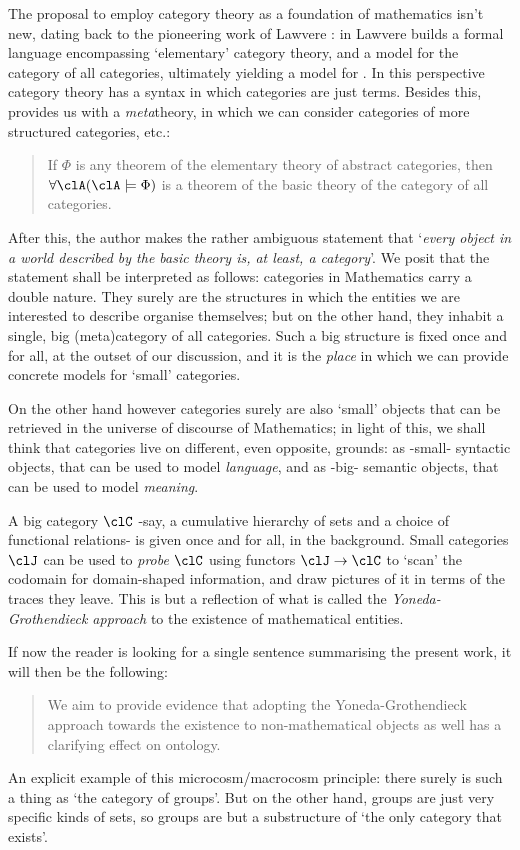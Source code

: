 The proposal to employ category theory as a foundation of mathematics isn't new, dating back to the pioneering work of Lawvere \cite{lawvere1964elementary,lajolla,lawvere1969adjointness,lawvere1963functorial}: in \cite{lajolla} Lawvere builds a formal language  encompassing `elementary' category theory, and a model  for the category of all categories, ultimately yielding a model for . In this perspective category theory has a syntax in which categories are just terms. Besides this,  provides us with a \emph{meta}theory, in which we can consider categories of more structured categories, etc.:
\begin{quote}
	If $\Phi$ is any theorem of the elementary theory of abstract categories, then $\forall \clA (\clA \models \Phi)$ is a theorem of the basic theory of the category of all categories. \hfill \cite{lajolla}
\end{quote}
After this, the author makes the rather ambiguous statement that `\textit{every object in a world described by the basic theory is, at least, a category}'. We posit that the statement shall be interpreted as follows: categories in Mathematics carry a double nature. They surely are the structures in which the entities we are interested to describe organise themselves; but on the other hand, they inhabit a single, big (meta)category of all categories. Such a big structure is fixed once and for all, at the outset of our discussion, and it is the \emph{place} in which we can provide concrete models for `small' categories.

On the other hand however categories surely are also `small' objects that can be retrieved in the universe of discourse of Mathematics; in light of this, we shall think that categories live on different, even opposite, grounds: as -small- syntactic objects, that can be used to model \emph{language}, and as -big- semantic objects, that can be used to model \emph{meaning}. 

A big category $\clC$ -say, a cumulative hierarchy of sets and a choice of functional relations- is given once and for all, in the background. Small categories $\clJ$ can be used to \emph{probe} $\clC$ using functors $\clJ \to \clC$ to `scan' the codomain for domain-shaped information, and draw pictures of it in terms of the traces they leave. This is but a reflection of what is called the \emph{Yoneda-Grothendieck approach} to the existence of mathematical entities.

If now the reader is looking for a single sentence summarising the present work, it will then be the following:
\begin{quote}
	We aim to provide evidence that adopting the Yoneda-Grothendieck approach towards the existence to non-mathematical objects as well has a clarifying effect on ontology.
\end{quote}
An explicit example of this microcosm\fshyp{}macrocosm principle: there surely is such a thing as `the category of groups'. But on the other hand, groups are just very specific kinds of sets, so groups are but a substructure of `the only category that exists'.

